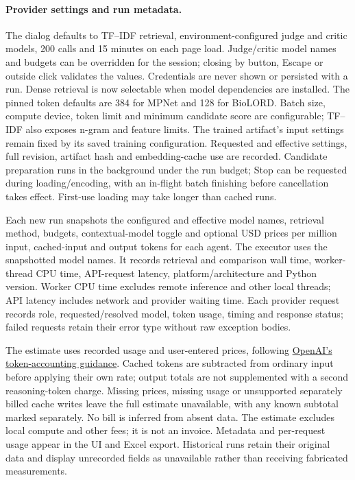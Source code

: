 \documentclass[10pt,letterpaper]{article}
\begin{document}
\paragraph{Provider settings and run metadata.}
The dialog defaults to TF--IDF retrieval, environment-configured judge and
critic models, 200 calls and 15 minutes on each page load. Judge/critic model
names and budgets can be overridden for the session; closing by button,
Escape or outside click validates the values. Credentials are never shown or
persisted with a run. Dense retrieval is now selectable when model dependencies
are installed. The pinned token defaults are 384 for MPNet and 128 for BioLORD.
Batch size, compute device, token limit and minimum candidate score are configurable;
TF--IDF also exposes n-gram and feature limits. The trained artifact's input
settings remain fixed by its saved training configuration. Requested and effective
settings, full revision, artifact hash and embedding-cache use are recorded.
Candidate preparation runs in the background under the run budget; Stop can be
requested during loading/encoding, with an in-flight batch finishing before
cancellation takes effect. First-use loading may take longer than cached runs.

Each new run snapshots the configured and effective model names, retrieval
method, budgets, contextual-model toggle and optional USD prices per million
input, cached-input and output tokens for each agent. The executor uses the
snapshotted model names. It records retrieval and comparison wall time,
worker-thread CPU time, API-request latency, platform/architecture and Python
version. Worker CPU time excludes remote inference and other local threads;
API latency includes network and provider waiting time. Each provider request
records role, requested/resolved model, token usage, timing and response status;
failed requests retain their error type without raw exception bodies.

The estimate uses recorded usage and user-entered prices, following
\href{https://developers.openai.com/api/docs/guides/prompt-caching}{OpenAI's token-accounting guidance}.
Cached tokens are subtracted from ordinary input before applying their own
rate; output totals are not supplemented with a second reasoning-token charge.
Missing prices, missing usage or unsupported separately billed cache writes
leave the full estimate unavailable, with any known subtotal marked separately.
No bill is inferred from absent data. The estimate excludes local compute and
other fees; it is not an invoice. Metadata and per-request usage appear in the
UI and Excel export. Historical runs retain their original data and display
unrecorded fields as unavailable rather than receiving fabricated measurements.
\end{document}
